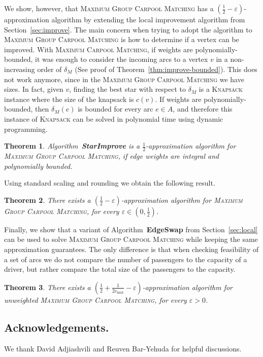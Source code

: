 \documentclass[11pt]{article}
\newtheorem{theorem}{Theorem}
\newcommand{\half}{\frac{1}{2}}
\newcommand{\inv}[1]{\frac{1}{#1}}
\newcommand{\carpool}{\textsc{Maximum Carpool Matching}\xspace}
\newcommand{\gcp}{\textsc{Maximum Group Carpool Matching}\xspace}
\newcommand{\cmax}{c_{\max}}
\newcommand{\eps}{\varepsilon}
\begin{document}
We show, however, that \gcp has a $(\half -\eps)$-approximation
algorithm by extending the local improvement algorithm from
Section~\ref{sec:improve}.
%
The main concern when trying to adopt the algorithm to \gcp is how to
determine if a vertex can be improved.
%
With \carpool, if weights are polynomially-bounded, it was enough to
consider the incoming arcs to a vertex $v$ in a non-increasing
order of $\delta_M$ (See proof of Theorem~\ref{thm:improve-bounded}).
This does not work anymore, since in the \gcp we have sizes.  In fact, given
$v$, finding the best star with respect to $\delta_M$ is
a \textsc{Knapsack} instance where the size of the knapsack is $c(v)$.
%
If weights are polynomially-bounded, then $\delta_M(e)$ is bounded for
every arc $e \in A$, and therefore this instance of \textsc{Knapsack}
can be solved in polynomial time using dynamic programming.

\begin{theorem}
Algorithm~\textbf{StarImprove} is a $\half$-approximation algorithm
for \gcp, if edge weights are integral and polynomially bounded.
\end{theorem}

Using standard scaling and rounding we obtain the following result.

\begin{theorem}
There exists a $(\half-\eps)$-approximation algorithm for \gcp,
for every $\eps \in (0,\half)$.
\end{theorem}


Finally, we show that a variant of Algorithm~\textbf{EdgeSwap} from
Section~\ref{sec:local} can be used to solve \gcp while keeping the
same approximation guarantees. 
%
The only difference is that when checking feasibility of a set of arcs
we do not compare the number of passengers to the capacity of a
driver, but rather compare the total size of the passengers to the
capacity.

\begin{theorem}
There exists a $(\half + \inv{2\cmax} - \eps)$-approximation algorithm
for unweighted \gcp, for every $\eps>0$.
\end{theorem}


\subsection*{Acknowledgements.}

We thank David Adjiashvili and Reuven Bar-Yehuda for helpful
discussions.




\end{document}
